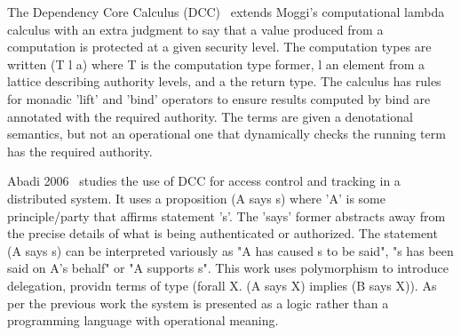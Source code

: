 The Dependency Core Calculus (DCC)~\cite{Abadi1999:DCC} extends Moggi's computational lambda calculus with an extra judgment to say that a value produced from a computation is protected at a given security level. The computation types are written (T l a) where T is the computation type former, l an element from a lattice describing authority levels, and a the return type. The calculus has rules for monadic 'lift' and 'bind' operators to ensure results computed by bind are annotated with the required authority. The terms are given a denotational semantics, but not an operational one that dynamically checks the running term has the required authority.

Abadi 2006~\cite{Abadi2007:AccessControl} studies the use of DCC for access control and tracking in a distributed system. It uses a proposition (A says s) where 'A' is some principle/party that affirms statement 's'. The 'says' former abstracts away from the precise details of what is being authenticated or authorized. The statement (A says s) can be interpreted variously as "A has caused s to be said", "s has been said on A's behalf" or "A supports s". This work uses polymorphism to introduce delegation, providn terms of type (forall X. (A says X) implies (B says X)). As per the previous work \cite{Abadi1999:DCC} the system is presented as a logic rather than a programming language with operational meaning.



